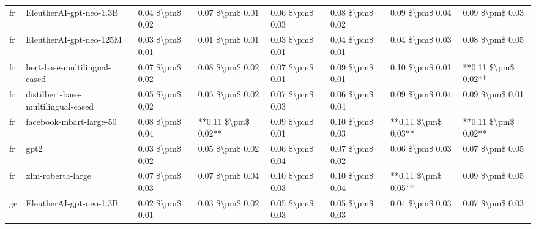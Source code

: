 \begin{tabular}{llllllll}
      fr &            EleutherAI-gpt-neo-1.3B & 0.04 \$\textbackslash pm\$ 0.02 &           0.07 \$\textbackslash pm\$ 0.01 &       0.06 \$\textbackslash pm\$ 0.03 &        0.08 \$\textbackslash pm\$ 0.02 &                         0.09 \$\textbackslash pm\$ 0.04 &     0.09 \$\textbackslash pm\$ 0.03 \\
      fr &            EleutherAI-gpt-neo-125M & 0.03 \$\textbackslash pm\$ 0.01 &           0.01 \$\textbackslash pm\$ 0.01 &       0.03 \$\textbackslash pm\$ 0.01 &        0.04 \$\textbackslash pm\$ 0.01 &                         0.04 \$\textbackslash pm\$ 0.03 &     0.08 \$\textbackslash pm\$ 0.05 \\
      fr &       bert-base-multilingual-cased & 0.07 \$\textbackslash pm\$ 0.02 &           0.08 \$\textbackslash pm\$ 0.02 &       0.07 \$\textbackslash pm\$ 0.01 &        0.09 \$\textbackslash pm\$ 0.01 &                         0.10 \$\textbackslash pm\$ 0.01 & **0.11 \$\textbackslash pm\$ 0.02** \\
      fr & distilbert-base-multilingual-cased & 0.05 \$\textbackslash pm\$ 0.02 &           0.05 \$\textbackslash pm\$ 0.02 &       0.07 \$\textbackslash pm\$ 0.03 &        0.06 \$\textbackslash pm\$ 0.04 &                         0.09 \$\textbackslash pm\$ 0.04 &     0.09 \$\textbackslash pm\$ 0.01 \\
      fr &            facebook-mbart-large-50 & 0.08 \$\textbackslash pm\$ 0.04 &       **0.11 \$\textbackslash pm\$ 0.02** &       0.09 \$\textbackslash pm\$ 0.01 &        0.10 \$\textbackslash pm\$ 0.03 &                     **0.11 \$\textbackslash pm\$ 0.03** & **0.11 \$\textbackslash pm\$ 0.02** \\
      fr &                               gpt2 & 0.03 \$\textbackslash pm\$ 0.02 &           0.05 \$\textbackslash pm\$ 0.02 &       0.06 \$\textbackslash pm\$ 0.04 &        0.07 \$\textbackslash pm\$ 0.02 &                         0.06 \$\textbackslash pm\$ 0.03 &     0.07 \$\textbackslash pm\$ 0.05 \\
      fr &                  xlm-roberta-large & 0.07 \$\textbackslash pm\$ 0.03 &           0.07 \$\textbackslash pm\$ 0.04 &       0.10 \$\textbackslash pm\$ 0.03 &        0.10 \$\textbackslash pm\$ 0.04 &                     **0.11 \$\textbackslash pm\$ 0.05** &     0.09 \$\textbackslash pm\$ 0.05 \\
      ge &            EleutherAI-gpt-neo-1.3B & 0.02 \$\textbackslash pm\$ 0.01 &           0.03 \$\textbackslash pm\$ 0.02 &       0.05 \$\textbackslash pm\$ 0.03 &        0.05 \$\textbackslash pm\$ 0.03 &                         0.04 \$\textbackslash pm\$ 0.03 &     0.07 \$\textbackslash pm\$ 0.03 \\

\end{tabular}
